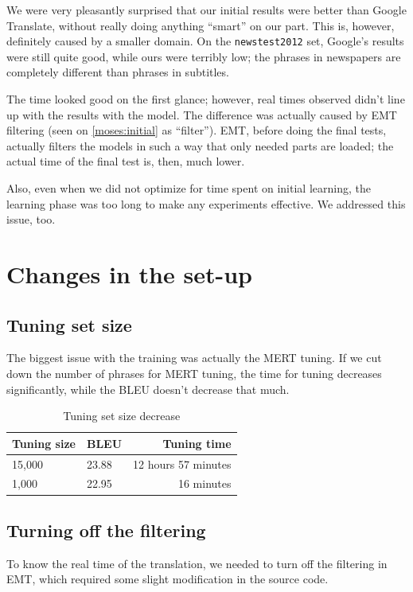 We were very pleasantly surprised that our initial results were better than Google Translate, without really doing anything ``smart'' on our part. This is, however, definitely caused by a smaller domain. On the \texttt{newstest2012} set, Google's results were still quite good, while ours were terribly low; the phrases in newspapers are completely different than phrases in subtitles.

The time looked good on the first glance; however, real times observed didn't line up with the results with the model. The difference was actually caused by EMT filtering (seen on \ref{moses:initial} as ``filter''). EMT, before doing the final tests, actually filters the models in such a way that only needed parts are loaded; the actual time of the final test is, then, much lower.

Also, even when we did not optimize for time spent on initial learning, the learning phase was too long to make any experiments effective. We addressed this issue, too.

\section{Changes in the set-up}
\subsection{Tuning set size}
The biggest issue with the training was actually the MERT tuning. If we cut down the number of phrases for MERT tuning, the time for tuning decreases significantly, while the BLEU doesn't decrease that much.
\begin{table}[h]
\begin{center}
\begin{tabular}{|l|l|r|}
    \hline
    \textbf{Tuning size} & \textbf{BLEU} & \textbf{Tuning time} \\ \hline
    15,000 & 23.88 & 12 hours 57 minutes \\ \hline
    1,000 & 22.95 & 16 minutes \\  \hline
\end{tabular}
\end{center}

\caption{Tuning set size decrease}\label{moses:initialresults}
\end{table}

\subsection{Turning off the filtering}
To know the real time of the translation, we needed to turn off the filtering in EMT, which required some slight modification in the source code. 

